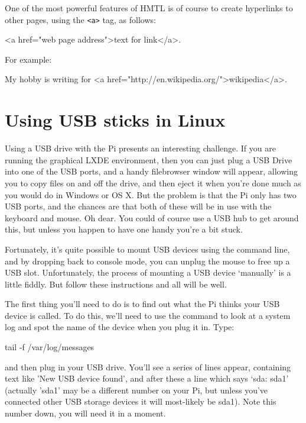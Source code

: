 One of the most powerful features of HMTL is of course to create hyperlinks to
other pages, using the \verb|<a>| tag, as follows:

\begin{ttoutenv}
<a href="web page address">text for link</a>.
\end{ttoutenv}

For example:

\begin{ttoutenv}
My hobby is writing for <a href="http://en.wikipedia.org/">wikipedia</a>.
\end{ttoutenv}

\section{Using USB sticks in Linux}

Using a USB drive with the Pi presents an interesting challenge. If you are running the graphical LXDE environment, then you can just plug a USB Drive into one of the USB ports, and a handy filebrowser window will appear, allowing you to copy files on and off the drive, and then eject it when you're done much as you would do in Windows or OS X. But the problem is that the Pi only has two USB ports, and the chances are that both of these will be in use with the keyboard and mouse. Oh dear. You could of course use a USB hub to get around this, but unless you happen to have one handy you're a bit stuck. 

Fortunately, it's quite possible to mount USB devices using the command line, and by dropping back to console mode, you can unplug the mouse to free up a USB slot. Unfortunately, the process of mounting a USB device `manually' is a little fiddly. But follow these instructions and all will be well.

The first thing you'll need to do is to find out what the Pi thinks your USB device is called. To do this, we'll need to use the  command to look at a system log and spot the name of the device when you plug it in. Type:

\begin{ttoutenv}
tail -f /var/log/messages
\end{ttoutenv}

and then plug in your USB drive. You'll see a series of lines appear, containing text like 'New USB device found', and after these a line which says `sda: sda1' (actually 'sda1' may be a different number on your Pi, but unless you've connected other USB storage devices it will most-likely be sda1). Note this number down, you will need it in a moment. 

